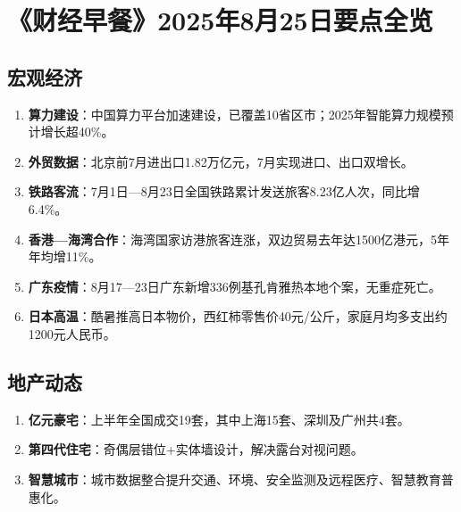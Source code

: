  \section{《财经早餐》2025年8月25日要点全览}


\subsection{宏观经济}
\begin{enumerate}[leftmargin=*, nosep]
    \item \textbf{算力建设}：中国算力平台加速建设，已覆盖10省区市；2025年智能算力规模预计增长超40\%。
    \item \textbf{外贸数据}：北京前7月进出口1.82万亿元，7月实现进口、出口双增长。
    \item \textbf{铁路客流}：7月1日—8月23日全国铁路累计发送旅客8.23亿人次，同比增6.4\%。
    \item \textbf{香港—海湾合作}：海湾国家访港旅客连涨，双边贸易去年达1500亿港元，5年年均增11\%。
    \item \textbf{广东疫情}：8月17—23日广东新增336例基孔肯雅热本地个案，无重症死亡。
    \item \textbf{日本高温}：酷暑推高日本物价，西红柿零售价40元/公斤，家庭月均多支出约1200元人民币。
\end{enumerate}

\subsection{地产动态}
\begin{enumerate}[leftmargin=*, nosep]
    \item \textbf{亿元豪宅}：上半年全国成交19套，其中上海15套、深圳及广州共4套。
    \item \textbf{第四代住宅}：奇偶层错位+实体墙设计，解决露台对视问题。
    \item \textbf{智慧城市}：城市数据整合提升交通、环境、安全监测及远程医疗、智慧教育普惠化。
\end{enumerate}

